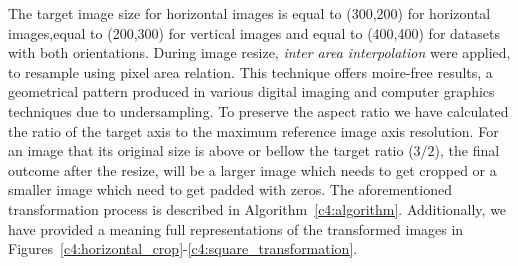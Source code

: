 The target image size for horizontal images is equal to (300,200) for horizontal images,equal to (200,300) for vertical images and equal to (400,400) for datasets with both orientations.
During image resize, \textit{inter area interpolation} were applied, to resample using pixel area relation. This technique offers moire-free results, a geometrical pattern produced in various digital imaging and computer graphics techniques due to undersampling.
To preserve the aspect ratio we have calculated the ratio of the target axis to the maximum reference image axis resolution. 
For an image that its original size is above or bellow the target ratio ($3/2$), the final outcome after the resize, will be a larger image which needs to get cropped or a smaller image which need to get padded with zeros.
The aforementioned transformation process is described in Algorithm~\ref{c4:algorithm}. Additionally, we have provided a meaning full representations of the transformed images in Figures~\ref{c4:horizontal_crop}-\ref{c4:square_transformation}.

